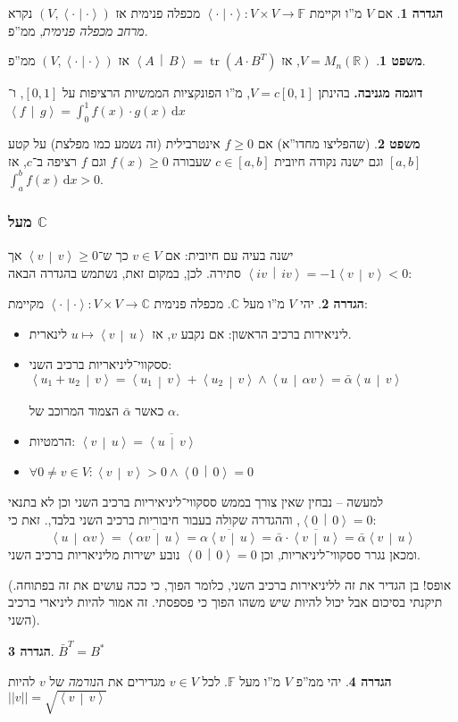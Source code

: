 \documentclass[a4paper]{article}
\newcommand\R     {\mathbb{R}}
\newcommand\C     {\mathbb{C}}
\newcommand\ra    {\rangle}
\newcommand\la    {\langle}
\newcommand\ol    {\overline}
\newcommand\dx    {\,\mathrm{d}x}
\DeclareMathOperator{\tr}      {tr}
\newcommand\F         {\mathbb{F}}
\newcommand\co        {\colon}
\newcommand\norm[1]   {\left \vert \left \vert #1 \right \vert \right \vert}
\newcommand\smut      {\left \la \cdot \mid \cdot \right \ra}
\newcommand\mut [2]   {\left \la #1 \,\middle\vert\, #2 \right \ra}
\newcommand\ag        {\alpha}
\theoremstyle{definition}
\newtheorem{Theorem}{משפט}
\newtheorem{definition}{הגדרה}
\newcommand\theo  [1] {\begin{Theorem}#1\end{Theorem}}
\newcommand\defi  [1] {\begin{definition}#1\end{definition}}
\begin{document}
	\defi{אם $V$ מ''ו וקיימת $\smut \co V \times V \to \F$ מכפלה פנימית אז $(V, \smut)$ נקרא \textit{מרחב מכפלה פנימית}, ממ''פ. }
	
	\theo{$V = M_n(\R)$, אז $\mut{A}{B} = \tr(A \cdot B^T)$ אז $(V, \smut)$ ממ''פ. }
	
	\textbf{דוגמה מגניבה. }בהינתן $V = c[0, 1]$, מ''ו הפונקציות הממשיות הרציפות על $[0, 1]$, ו־$\mut{f}{g} = \int_0^1 f(x) \cdot g(x) \dx$ 
	\theo{(שהפליצו מחדו''א) אם $f \ge 0$ אינטרבילית (זה נשמע כמו מפלצת) על קטע $[a, b]$ וגם ישנה נקודה חיובית $c \in [a, b]$ שעבורה $f(x) \ge 0$ וגם $f$ רציפה ב־$c$, אז $\int^b_a f(x) \dx > 0$. }
	
	\subsubsection{מעל $\C$}
	ישנה בעיה עם חיובית: אם $v \in V$ כך ש־$\mut{v}{v} \ge 0$ אך $\mut{iv}{iv} = -1\mut{v}{v} < 0$ סתירה. לכן, במקום זאת, נשתמש בהגדרה הבאה: 
	\defi{יהי $V$ מ''ו מעל $\C$. מכפלה פנימית $\smut \co V \times V \to \C$ מקיימת: 
		\begin{itemize}
			\item ליניאירות ברכיב הראשון: אם נקבע $v$, אז $u \mapsto \mut{v}{u}$ לינארית. 
			\item ססקווי־ליניאריות ברכיב השני: \hfill $\mut{u_1 + u_2}{v} = \mut{u_1}{v} + \mut{u_2}{v} \land \mut{u}{\ag v} = \bar \ag \mut{u}{v}$ 
			
			כאשר $\bar \ag$ הצמוד המרוכב של $\ag$. 
			\item הרמטיות: \hfill $\mut{v}{u} = \ol{\mut{u}{v}}$
			\item \hfil $\forall 0 \neq v \in V \co \mut{v}{v} > 0 \land \mut{0}{0} = 0$
	\end{itemize}}
	למעשה – נבחין שאין צורך בממש ססקווי־ליניאיריות ברכיב השני וכן לא בתנאי $\mut{0}{0} = 0$, וההגדרה שקולה בעבור חיבוריות ברכיב השני בלבד,. זאת כי: 
	\[ \mut{u}{\ag v} = \ol{\mut{\ag v}{u}} = \ol{\ag \mut{v}{u}} = \bar \ag \cdot \ol{\mut{v}{u}} = \bar \ag \mut{v}{u} \]
	ומכאן נגרר ססקווי־ליניאריות, וכן $\mut{0}{0} = 0$ נובע ישירות מליניאריות ברכיב השני. 
	
	(אופס! בן הגדיר את זה לליניאירות ברכיב השני, כלומר הפוך, כי ככה עושים את זה בפתוחה. תיקנתי בסיכום אבל יכול להיות שיש משהו הפוך כי פספסתי. זה אמור להיות ליניארי ברכיב השני).
	
	\defi{\hfil $\bar B^T = B^*$}
	
	\defi{יהי ממ''פ $V$ מ''ו מעל $\F$. לכל $v \in V$ מגדירים את ה\textit{נורמה} של $v$ להיות $ \norm{v} = \sqrt{\mut{v}{v}} $}
	
\end{document}
